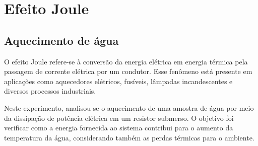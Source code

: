 \documentclass[conference]{IEEEtran}
\begin{document}








\section{Efeito Joule}

\subsection{Aquecimento de água}

O efeito Joule refere-se à conversão da energia elétrica em energia térmica pela passagem de corrente elétrica por um condutor. Esse fenômeno está presente em aplicações como aquecedores elétricos, fusíveis, lâmpadas incandescentes e diversos processos industriais.

Neste experimento, analisou-se o aquecimento de uma amostra de água por meio da dissipação de potência elétrica em um resistor submerso. O objetivo foi verificar como a energia fornecida ao sistema contribui para o aumento da temperatura da água, considerando também as perdas térmicas para o ambiente.
\end{document}

